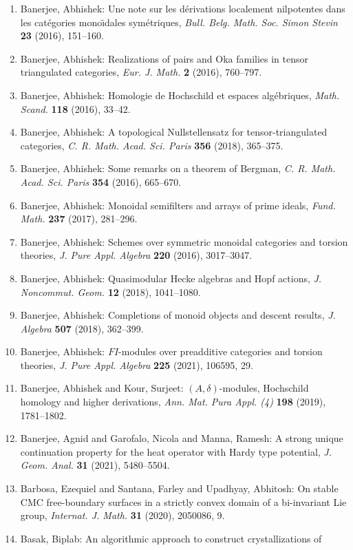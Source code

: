 \begin{enumerate}
\item Banerjee, Abhishek: Une note sur les d\'erivations localement nilpotentes dans les
cat\'egories mono\"\i dales sym\'etriques, \emph{Bull. Belg. Math. Soc. Simon Stevin} {\bf 23} (2016), 151--160.
\item Banerjee, Abhishek: Realizations of pairs and {O}ka families in tensor
triangulated categories, \emph{Eur. J. Math.} {\bf 2} (2016), 760--797.
\item Banerjee, Abhishek: Homologie de {H}ochschild et espaces alg\'ebriques, \emph{Math. Scand.} {\bf 118} (2016), 33--42.
\item Banerjee, Abhishek: A topological {N}ullstellensatz for tensor-triangulated
categories, \emph{C. R. Math. Acad. Sci. Paris} {\bf 356} (2018), 365--375.
\item Banerjee, Abhishek: Some remarks on a theorem of {B}ergman, \emph{C. R. Math. Acad. Sci. Paris} {\bf 354} (2016), 665--670.
\item Banerjee, Abhishek: Monoidal semifilters and arrays of prime ideals, \emph{Fund. Math.} {\bf 237} (2017), 281--296.
\item Banerjee, Abhishek: Schemes over symmetric monoidal categories and torsion
theories, \emph{J. Pure Appl. Algebra} {\bf 220} (2016), 3017--3047.
\item Banerjee, Abhishek: Quasimodular {H}ecke algebras and {H}opf actions, \emph{J. Noncommut. Geom.} {\bf 12} (2018), 1041--1080.
\item Banerjee, Abhishek: Completions of monoid objects and descent results, \emph{J. Algebra} {\bf 507} (2018), 362--399.
\item Banerjee, Abhishek: {$FI$}-modules over preadditive categories and torsion
theories, \emph{J. Pure Appl. Algebra} {\bf 225} (2021), 106595, 29.
\item Banerjee, Abhishek and Kour, Surjeet: {$(A,\delta)$}-modules, {H}ochschild homology and higher
derivations, \emph{Ann. Mat. Pura Appl. (4)} {\bf 198} (2019), 1781--1802.
\item Banerjee, Agnid and Garofalo, Nicola and Manna, Ramesh: A strong unique continuation property for the heat operator
with {H}ardy type potential, \emph{J. Geom. Anal.} {\bf 31} (2021), 5480--5504.
\item Barbosa, Ezequiel and Santana, Farley and Upadhyay, Abhitosh: On stable {CMC} free-boundary surfaces in a strictly convex
domain of a bi-invariant {L}ie group, \emph{Internat. J. Math.} {\bf 31} (2020), 2050086, 9.
\item Basak, Biplab: An algorithmic approach to construct crystallizations of

\end{enumerate}
